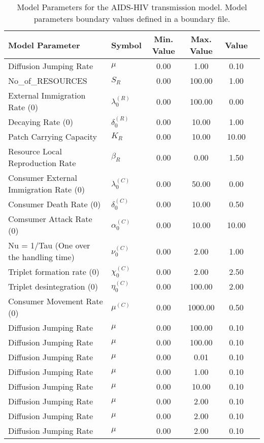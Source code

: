 \begin{table}
\centering
\begin{tabular}{p{5cm}lcccc}
{\bf Model Parameter} & {\bf Symbol} & {\bf Min. Value} & {\bf Max. Value} & {\bf Value}\\
\hline\hline
Diffusion Jumping Rate & $\mu$ & 0.00 & 1.00 & 0.10\\
No_of_RESOURCES & $S_R$ & 0.00 & 100.00 & 1.00\\
External Immigration Rate (0) & $\lambda^{(R)}_0$ & 0.00 & 100.00 & 0.00\\
Decaying Rate (0) & $\delta^{(R)}_0$ & 0.00 & 10.00 & 1.00\\
Patch Carrying Capacity & $K_R$ & 0.00 & 10.00 & 10.00\\
Resource Local Reproduction Rate & $\beta_R$ & 0.00 & 0.00 & 1.50\\
Consumer External Immigration Rate (0) & $\lambda^{(C)}_0$ & 0.00 & 50.00 & 0.00\\
Consumer Death Rate (0) & $\delta^{(C)}_0$ & 0.00 & 10.00 & 0.50\\
Comsumer Attack Rate (0) & $\alpha^{(C)}_0$ & 0.00 & 10.00 & 10.00\\
Nu = 1/Tau (One over the handling time) & $\nu^{(C)}_0$ & 0.00 & 2.00 & 1.00\\
Triplet formation rate (0) & $\chi^{(C)}_0$ & 0.00 & 2.00 & 2.50\\
Triplet desintegration (0) & $\eta^{(C)}_0$ & 0.00 & 100.00 & 2.00\\
Consumer Movement Rate (0) & $\mu^{(C)}$ & 0.00 & 1000.00 & 0.50\\
Diffusion Jumping Rate & $\mu$ & 0.00 & 100.00 & 0.10\\
Diffusion Jumping Rate & $\mu$ & 0.00 & 100.00 & 0.10\\
Diffusion Jumping Rate & $\mu$ & 0.00 & 0.01 & 0.10\\
Diffusion Jumping Rate & $\mu$ & 0.00 & 1.00 & 0.10\\
Diffusion Jumping Rate & $\mu$ & 0.00 & 10.00 & 0.10\\
Diffusion Jumping Rate & $\mu$ & 0.00 & 2.00 & 0.10\\
Diffusion Jumping Rate & $\mu$ & 0.00 & 2.00 & 0.10\\
Diffusion Jumping Rate & $\mu$ & 0.00 & 2.00 & 0.10\\
\hline\hline
\end{tabular}
\caption{Model Parameters for the AIDS-HIV transmission model. Model parameters boundary values defined in a boundary file.}
\end{table}
